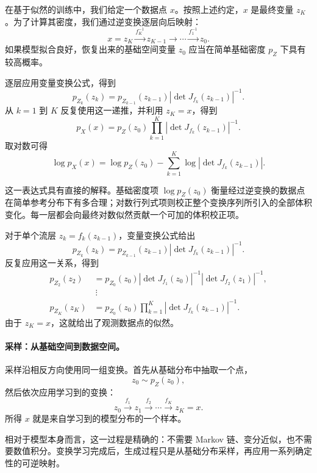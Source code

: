 在基于似然的训练中，我们给定一个数据点 $x$。按照上述约定，$x$ 是最终变量 $z_K$。为了计算其密度，我们通过逆变换逐层向后映射：
\[
x=z_K
\xrightarrow{f_K^{-1}}
z_{K-1}
\xrightarrow{}
\cdots
\xrightarrow{f_1^{-1}}
z_0.
\]
如果模型拟合良好，恢复出来的基础空间变量 $z_0$ 应当在简单基础密度 $p_Z$ 下具有较高概率。

逐层应用变量变换公式，得到
\[
p_{Z_k}(z_k)
=
p_{Z_{k-1}}(z_{k-1})
\left|
\det J_{f_k}(z_{k-1})
\right|^{-1}.
\]
从 $k=1$ 到 $K$ 反复使用这一递推，并利用 $z_K=x$，得到
\[
\boxed{
p_X(x)
=
p_Z(z_0)
\prod_{k=1}^K
\left|
\det J_{f_k}(z_{k-1})
\right|^{-1}.
}
\]
取对数可得
\[
\boxed{
\log p_X(x)
=
\log p_Z(z_0)
-
\sum_{k=1}^K
\log
\left|
\det J_{f_k}(z_{k-1})
\right|.
}
\]

这一表达式具有直接的解释。基础密度项 $\log p_Z(z_0)$ 衡量经过逆变换的数据点在简单参考分布下有多合理；对数行列式项则校正整个变换序列所引入的全部体积变化。每一层都会向最终对数似然贡献一个可加的体积校正项。

\begin{tcolorbox}[
  colback=blue!3,
  colframe=blue!50!black,
  title={乘积形式是如何产生的},
  boxrule=0.6pt,
  arc=2mm,
  left=2mm,
  right=2mm,
  top=1mm,
  bottom=1mm
]
对于单个流层 $z_k=f_k(z_{k-1})$，变量变换公式给出
\[
p_{Z_k}(z_k)
=
p_{Z_{k-1}}(z_{k-1})
\left|\det J_{f_k}(z_{k-1})\right|^{-1}.
\]
反复应用这一关系，得到
\[
\begin{aligned}
p_{Z_2}(z_2)
&=
p_{Z_0}(z_0)
\left|\det J_{f_1}(z_0)\right|^{-1}
\left|\det J_{f_2}(z_1)\right|^{-1},\\
&\ \vdots\\
p_{Z_K}(z_K)
&=
p_{Z_0}(z_0)
\prod_{k=1}^K
\left|\det J_{f_k}(z_{k-1})\right|^{-1}.
\end{aligned}
\]
由于 $z_K=x$，这就给出了观测数据点的似然。
\end{tcolorbox}

\paragraph{采样：从基础空间到数据空间。}

采样沿相反方向使用同一组变换。首先从基础分布中抽取一个点，
\[
z_0\sim p_Z(z_0),
\]
然后依次应用学习到的变换：
\[
z_0
\xrightarrow{f_1}
z_1
\xrightarrow{f_2}
\cdots
\xrightarrow{f_K}
z_K=x.
\]
所得 $x$ 就是来自学习到的模型分布的一个样本。

相对于模型本身而言，这一过程是精确的：不需要 Markov 链、变分近似，也不需要数值积分。变换学习完成后，生成过程只是从基础分布采样，再应用一系列确定性的可逆映射。

